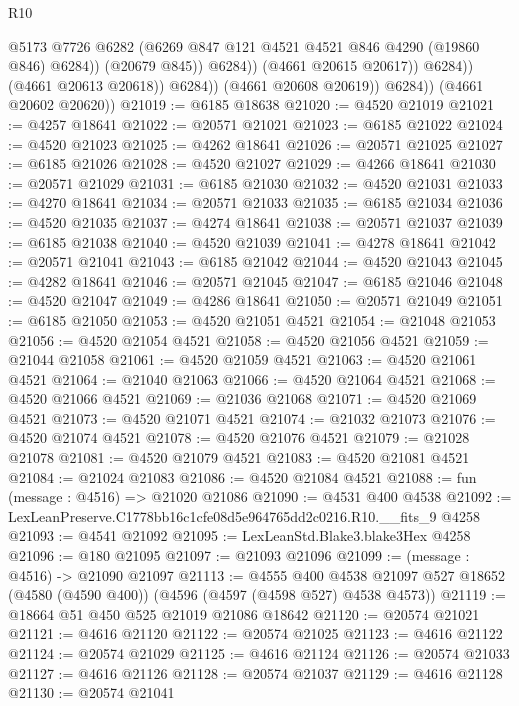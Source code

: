 \begin{lexlean}{R10}
\begin{coremodule}
                                @5173
                                @7726
                                @6282
                                (@6269 @847 @121 @4521 @4521 @846 @4290 (@19860 @846) @6284))
                              (@20679 @845))
                            @6284))
                        (@4661 @20615 @20617))
                      @6284))
                  (@4661 @20613 @20618))
                @6284))
            (@4661 @20608 @20619))
          @6284))
      (@4661 @20602 @20620))
@21019 := @6185 @18638
@21020 := @4520 @21019
@21021 := @4257 @18641
@21022 := @20571 @21021
@21023 := @6185 @21022
@21024 := @4520 @21023
@21025 := @4262 @18641
@21026 := @20571 @21025
@21027 := @6185 @21026
@21028 := @4520 @21027
@21029 := @4266 @18641
@21030 := @20571 @21029
@21031 := @6185 @21030
@21032 := @4520 @21031
@21033 := @4270 @18641
@21034 := @20571 @21033
@21035 := @6185 @21034
@21036 := @4520 @21035
@21037 := @4274 @18641
@21038 := @20571 @21037
@21039 := @6185 @21038
@21040 := @4520 @21039
@21041 := @4278 @18641
@21042 := @20571 @21041
@21043 := @6185 @21042
@21044 := @4520 @21043
@21045 := @4282 @18641
@21046 := @20571 @21045
@21047 := @6185 @21046
@21048 := @4520 @21047
@21049 := @4286 @18641
@21050 := @20571 @21049
@21051 := @6185 @21050
@21053 := @4520 @21051 @4521
@21054 := @21048 @21053
@21056 := @4520 @21054 @4521
@21058 := @4520 @21056 @4521
@21059 := @21044 @21058
@21061 := @4520 @21059 @4521
@21063 := @4520 @21061 @4521
@21064 := @21040 @21063
@21066 := @4520 @21064 @4521
@21068 := @4520 @21066 @4521
@21069 := @21036 @21068
@21071 := @4520 @21069 @4521
@21073 := @4520 @21071 @4521
@21074 := @21032 @21073
@21076 := @4520 @21074 @4521
@21078 := @4520 @21076 @4521
@21079 := @21028 @21078
@21081 := @4520 @21079 @4521
@21083 := @4520 @21081 @4521
@21084 := @21024 @21083
@21086 := @4520 @21084 @4521
@21088 := fun (message : @4516) => @21020 @21086
@21090 := @4531 @400 @4538
@21092 := LexLeanPreserve.C1778bb16c1cfe08d5e964765dd2c0216.R10.__fits_9 @4258
@21093 := @4541 @21092
@21095 := LexLeanStd.Blake3.blake3Hex @4258
@21096 := @180 @21095
@21097 := @21093 @21096
@21099 := (message : @4516) -> @21090 @21097
@21113 := @4555
    @400
    @4538
    @21097
    @527
    @18652
    (@4580 (@4590 @400))
    (@4596 (@4597 (@4598 @527) @4538 @4573))
@21119 := @18664 @51 @450 @525 @21019 @21086 @18642
@21120 := @20574 @21021
@21121 := @4616 @21120
@21122 := @20574 @21025
@21123 := @4616 @21122
@21124 := @20574 @21029
@21125 := @4616 @21124
@21126 := @20574 @21033
@21127 := @4616 @21126
@21128 := @20574 @21037
@21129 := @4616 @21128
@21130 := @20574 @21041

\end{coremodule}
\end{lexlean}
